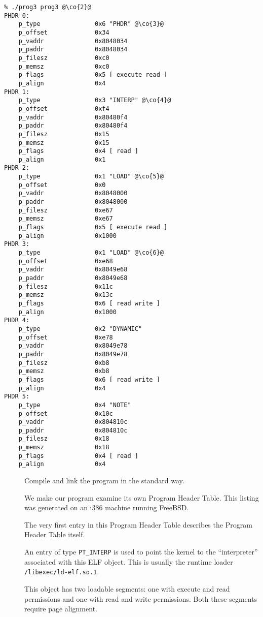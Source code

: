 \documentclass[a4paper]{book}
\makeatletter
\newcommand{\constant}[1]{\texttt{#1}}
\newcommand{\filename}[1]{\texttt{#1}}
\newcommand{\trade}{\texttrademark\xspace}
\newenvironment{callout}[2][blue]{%
  \begingroup\newcommand{\@cocolor}{#1}%
  \newcommand{\@cogroup}[1]{#2}}{\endgroup}
\newcommand{\@co}[1]{\framebox{\textbf{\color{\@cocolor}#1}}}
\newcommand{\co}[1]{%
  \hypertarget{\@cogroup.#1.co}{%
    \hyperlink{\@cogroup.#1.cr}{\@co{#1}}}}
\newcommand{\coref}[1]{%
  \hypertarget{\@cogroup.#1.cr}{%
    \hyperlink{\@cogroup.#1.co}{\@co{#1}}}}
\makeatother
\begin{document}
\begin{callout}[red]{scr3}
  \begin{lstlisting}[language={}, basicstyle=\small\ttfamily,
      label=scr.prog3, caption=Compiling and Running prog3]
% cc -o prog3 prog3.c -lelf @\co{1}@
% ./prog3 prog3 @\co{2}@
PHDR 0:
    p_type               0x6 "PHDR" @\co{3}@
    p_offset             0x34
    p_vaddr              0x8048034
    p_paddr              0x8048034
    p_filesz             0xc0
    p_memsz              0xc0
    p_flags              0x5 [ execute read ]
    p_align              0x4
PHDR 1:
    p_type               0x3 "INTERP" @\co{4}@
    p_offset             0xf4
    p_vaddr              0x80480f4
    p_paddr              0x80480f4
    p_filesz             0x15
    p_memsz              0x15
    p_flags              0x4 [ read ]
    p_align              0x1
PHDR 2:
    p_type               0x1 "LOAD" @\co{5}@
    p_offset             0x0
    p_vaddr              0x8048000
    p_paddr              0x8048000
    p_filesz             0xe67
    p_memsz              0xe67
    p_flags              0x5 [ execute read ]
    p_align              0x1000
PHDR 3:
    p_type               0x1 "LOAD" @\co{6}@
    p_offset             0xe68
    p_vaddr              0x8049e68
    p_paddr              0x8049e68
    p_filesz             0x11c
    p_memsz              0x13c
    p_flags              0x6 [ read write ]
    p_align              0x1000
PHDR 4:
    p_type               0x2 "DYNAMIC"
    p_offset             0xe78
    p_vaddr              0x8049e78
    p_paddr              0x8049e78
    p_filesz             0xb8
    p_memsz              0xb8
    p_flags              0x6 [ read write ]
    p_align              0x4
PHDR 5:
    p_type               0x4 "NOTE"
    p_offset             0x10c
    p_vaddr              0x804810c
    p_paddr              0x804810c
    p_filesz             0x18
    p_memsz              0x18
    p_flags              0x4 [ read ]
    p_align              0x4
  \end{lstlisting}

  \begin{description}
  \item[\coref{1}] Compile and link the program in the standard way.
  \item[\coref{2}] We make our program examine its own Program Header
    Table.  This listing was generated on an i386\trade machine
    running FreeBSD.
  \item[\coref{3}] The very first entry in this Program Header Table
    describes the Program Header Table itself.
  \item[\coref{4}] An entry of type \constant{PT\_INTERP} is used to
    point the kernel to the ``interpreter'' associated with this ELF
    object.  This is usually the runtime loader
    \filename{/libexec/ld-elf.so.1}.
  \item[\coref{5} \coref{6}] This object has two loadable segments:
    one with execute and read permissions and one with read and write
    permissions.  Both these segments require page alignment.
  \end{description}
\end{callout}
\end{document}
